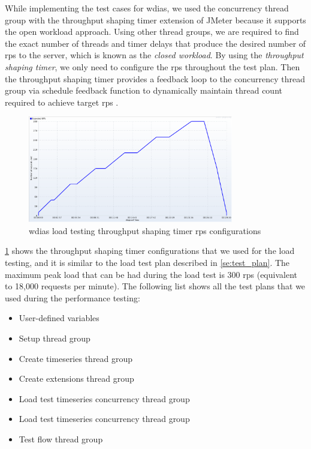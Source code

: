While implementing the test cases for \acrshort{wdias}, we used the concurrency thread group with the throughput shaping timer extension of JMeter because it supports the open workload approach. Using other thread groups, we are required to find the exact number of threads and timer delays that produce the desired number of \acrfull{rps} to the server, which is known as the \emph{closed workload}. By using the \emph{throughput shaping timer}, we only need to configure the \acrshort{rps} throughout the test plan. Then the throughput shaping timer provides a feedback loop to the concurrency thread group via schedule feedback function to dynamically maintain thread count required to achieve target \acrshort{rps} \cite{KarunarathneGihanWdias/wdias-performance-test:JMeter.}.

\begin{figure}[htp]
    \centering
    \includegraphics[width=0.8\textwidth]{results/work_load/test_prod_throughtput_shaping_timer.png}
    \caption{\acrshort{wdias} load testing throughput shaping timer \acrshort{rps} configurations}
    \label{fi:test_prod_throughtput_shaping_timer}
\end{figure}

\cref{fi:test_prod_throughtput_shaping_timer} shows the throughput shaping timer configurations that we used for the load testing, and it is similar to the load test plan described in \cref{se:test_plan}. The maximum peak load that can be had during the load test is 300 \acrshort{rps} (equivalent to 18,000 requests per minute). The following list shows all the test plans that we used during the performance testing:

\begin{itemize}
    \item User-defined variables
    \item Setup thread group
    \item Create timeseries thread group
    \item Create extensions thread group
    \item Load test timeseries concurrency thread group
    \item Load test timeseries concurrency thread group
    \item Test flow thread group
\end{itemize}

